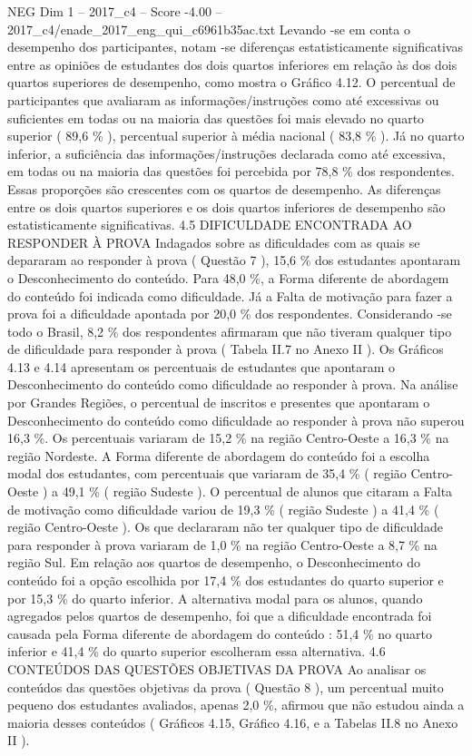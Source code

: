 \begin{textsample}{NEG Dim 1 – 2017\_c4 – Score -4.00 – 2017\_c4/enade\_2017\_eng\_qui\_c6961b35ac.txt}
Levando -se em conta o desempenho dos participantes, notam -se diferenças estatisticamente significativas entre as opiniões de estudantes dos dois quartos inferiores em relação às dos dois quartos superiores de desempenho, como mostra o Gráfico 4.12.
O percentual de participantes que avaliaram as informações/instruções como até excessivas ou suficientes em todas ou na maioria das questões foi mais elevado no quarto superior ( 89,6 \% ), percentual superior à média nacional ( 83,8 \% ).
Já no quarto inferior, a suficiência das informações/instruções declarada como até excessiva, em todas ou na maioria das questões foi percebida por 78,8 \% dos respondentes.
Essas proporções são crescentes com os quartos de desempenho.
As diferenças entre os dois quartos superiores e os dois quartos inferiores de desempenho são estatisticamente significativas. 4.5 DIFICULDADE ENCONTRADA AO RESPONDER À PROVA Indagados sobre as dificuldades com as quais se depararam ao responder à prova ( Questão 7 ), 15,6 \% dos estudantes apontaram o Desconhecimento do conteúdo.
Para 48,0 \%, a Forma diferente de abordagem do conteúdo foi indicada como dificuldade.
Já a Falta de motivação para fazer a prova foi a dificuldade apontada por 20,0 \% dos respondentes.
Considerando -se todo o Brasil, 8,2 \% dos respondentes afirmaram que não tiveram qualquer tipo de dificuldade para responder à prova ( Tabela II.7 no Anexo II ).
Os Gráficos 4.13 e 4.14 apresentam os percentuais de estudantes que apontaram o Desconhecimento do conteúdo como dificuldade ao responder à prova.
Na análise por Grandes Regiões, o percentual de inscritos e presentes que apontaram o Desconhecimento do conteúdo como dificuldade ao responder à prova não superou 16,3 \%.
Os percentuais variaram de 15,2 \% na região Centro-Oeste a 16,3 \% na região Nordeste.
A Forma diferente de abordagem do conteúdo foi a escolha modal dos estudantes, com percentuais que variaram de 35,4 \% ( região Centro-Oeste ) a 49,1 \% ( região Sudeste ).
O percentual de alunos que citaram a Falta de motivação como dificuldade variou de 19,3 \% ( região Sudeste ) a 41,4 \% ( região Centro-Oeste ).
Os que declararam não ter qualquer tipo de dificuldade para responder à prova variaram de 1,0 \% na região Centro-Oeste a 8,7 \% na região Sul.
Em relação aos quartos de desempenho, o Desconhecimento do conteúdo foi a opção escolhida por 17,4 \% dos estudantes do quarto superior e por 15,3 \% do quarto inferior.
A alternativa modal para os alunos, quando agregados pelos quartos de desempenho, foi que a dificuldade encontrada foi causada pela Forma diferente de abordagem do conteúdo : 51,4 \% no quarto inferior e 41,4 \% do quarto superior escolheram essa alternativa. 4.6 CONTEÚDOS DAS QUESTÕES OBJETIVAS DA PROVA Ao analisar os conteúdos das questões objetivas da prova ( Questão 8 ), um percentual muito pequeno dos estudantes avaliados, apenas 2,0 \%, afirmou que não estudou ainda a maioria desses conteúdos ( Gráficos 4.15, Gráfico 4.16, e a Tabelas II.8 no Anexo II ).

\end{textsample}

